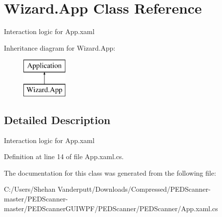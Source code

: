 \hypertarget{class_wizard_1_1_app}{}\section{Wizard.\+App Class Reference}
\label{class_wizard_1_1_app}


Interaction logic for App.\+xaml  


Inheritance diagram for Wizard.\+App\+:\begin{figure}[H]
\begin{center}
\leavevmode
\includegraphics[height=2.000000cm]{class_wizard_1_1_app}
\end{center}
\end{figure}


\subsection{Detailed Description}
Interaction logic for App.\+xaml 



Definition at line 14 of file App.\+xaml.\+cs.



The documentation for this class was generated from the following file\+:\begin{DoxyCompactItemize}
\item 
C\+:/\+Users/\+Shehan Vanderputt/\+Downloads/\+Compressed/\+P\+E\+D\+Scanner-\/master/\+P\+E\+D\+Scanner-\/master/\+P\+E\+D\+Scanner\+G\+U\+I\+W\+P\+F/\+P\+E\+D\+Scanner/\+P\+E\+D\+Scanner/App.\+xaml.\+cs\end{DoxyCompactItemize}
